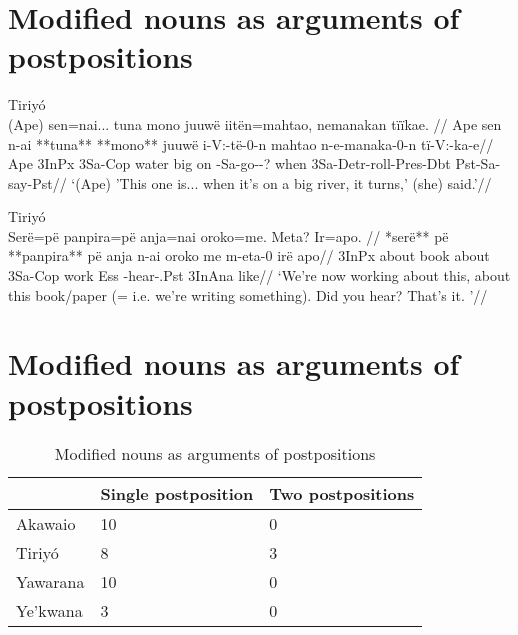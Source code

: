 \documentclass[10pt]{article}
\begin{document}

\section{Modified nouns as arguments of postpositions}

\ex Tiriyó \parencite{meiraDBtrio} \\
\label{dados-09-kereramake-p-041-270}    \begingl
    \glpreamble (Ape) sen=nai... tuna mono juuwë iitën=mahtao, nemanakan tïïkae. //
    \gla Ape sen n-ai **tuna** **mono** juuwë i-V:-të-0-n mahtao n-e-manaka-0-n tï-V:-ka-e//
    \glb Ape 3InPx 3Sa-Cop water big on -Sa-go--? when 3Sa-Detr-roll-Pres-Dbt Pst-Sa-say-Pst//
        \glft ‘(Ape) 'This one is... when it's on a big river, it turns,' (she) said.’//  
    \endgl 
\xe

\ex Tiriyó \parencite{meiraDBtrio} \\
\label{mini-disc-lsmtam13set0001-marciano-little-introduction-005}    \begingl
    \glpreamble Serë=pë panpira=pë anja=nai oroko=me. Meta? Ir=apo. //
    \gla **serë** pë **panpira** pë anja n-ai oroko me m-eta-0 irë apo//
    \glb 3InPx about book about  3Sa-Cop work Ess -hear-.Pst 3InAna like//
        \glft ‘We're now working about this, about this book/paper (= i.e. we're writing something). Did you hear? That's it.  ’//  
    \endgl 
\xe

\section{Modified nouns as arguments of postpositions}

\begin{table}
\caption{Modified nouns as arguments of postpositions}
\label{tab:postparg}
\centering
\begin{tabular}{lll}
\toprule
         & Single postposition & Two postpositions \\
\midrule
 Akawaio &                  10 &                 0 \\
  Tiriyó &                   8 &                 3 \\
Yawarana &                  10 &                 0 \\
Ye'kwana &                   3 &                 0 \\
\bottomrule
\end{tabular}

\end{table}
\end{document}
